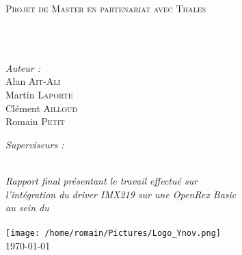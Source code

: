 \documentclass[
11pt, %
french, %
singlespacing, %
headsepline, %
]{MastersDoctoralThesis} %
\author{Alan \textsc{Ait-Ali}, Martin \textsc{Laporte}, \\
Clément \textsc{Ailloud} \& Romain \textsc{Petit} \\ } %
\begin{document}
\frontmatter %

\pagestyle{plain} %


\begin{titlepage}
\begin{center}

\vspace*{.06\textheight}
{\scshape\LARGE \univname\par}\vspace{1.5cm} %
\textsc{\Large Projet de Master en partenariat avec Thales}\\[0.5cm] %

\HRule \\[0.4cm] %
{\huge \bfseries \ttitle\par}\vspace{0.4cm} %
\HRule \\[1.5cm] %
 
\begin{minipage}[t]{0.4\textwidth}
\begin{flushleft} \large
\emph{Auteur :}\\
Alan \textsc{Ait-Ali} \\
Martin \textsc{Laporte} \\
Clément \textsc{Ailloud} \\
Romain \textsc{Petit}
\end{flushleft}
\end{minipage}
\begin{minipage}[t]{0.4\textwidth}
\begin{flushright} \large
\emph{Superviseurs :} \\
\supname %
\end{flushright}
\end{minipage}\\[3cm]

\large \textit{Rapport final présentant le travail effectué sur \\
				l'intégration du driver IMX219 sur une OpenRex Basic}\\[0.3cm] %
\textit{au sein du}\\[0.4cm]
\deptname\\[2cm] %

\texttt{[image: /home/romain/Pictures/Logo\_Ynov.png]}\\[1cm] %

{\large \today}\\[4cm] %

 
\vfill
\end{center}
\end{titlepage}
\end{document}
